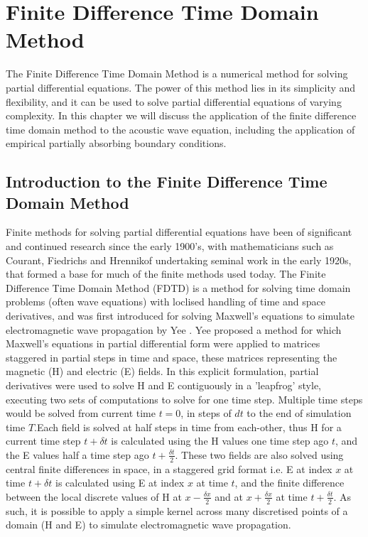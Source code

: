 %
%
%
\chapter{Finite Difference Time Domain Method}
\label{Introduction}
The Finite Difference Time Domain Method is a numerical method for solving partial differential equations. The power of this method lies in its simplicity and flexibility, and it can be used to solve partial differential equations of varying complexity. In this chapter we will discuss the application of the finite difference time domain method to the acoustic wave equation, including the application of empirical partially absorbing boundary conditions.

\section{Introduction to the Finite Difference Time Domain Method}
Finite methods for solving partial differential equations have been of significant and continued research since the early 1900's, with mathematicians such as Courant, Fiedrichs and Hrennikof undertaking seminal work in the early 1920s, that formed a base for much of the finite methods used today. The Finite Difference Time Domain Method (FDTD) is a method for solving time domain problems (often wave equations) with loclised handling of time and space derivatives, and was first introduced for solving Maxwell's equations to simulate electromagnetic wave propagation by Yee \cite{Yee1966}. Yee proposed a method for which Maxwell's equations in partial differential form were applied to matrices staggered in partial steps in time and space, these matrices representing the magnetic (H) and electric (E) fields. In this explicit formulation, partial derivatives were used to solve H and E contiguously in a 'leapfrog' style, executing two sets of computations to solve for one time step. Multiple time steps would be solved from current time $t = 0$, in steps of $dt$ to the end of simulation time $T$.Each field is solved at half steps in time from each-other, thus H for a current time step $t + \delta t$ is calculated using the H values one time step ago $t$, and the E values half a time step ago $t + \frac{\delta t}{2} $. These two fields are also solved using central finite differences in space, in a staggered grid format i.e. E at index $x$ at time $t + \delta t$ is calculated using E at index $x$ at time $t$, and the finite difference between the local discrete values of H at $x - \frac{\delta x}{2} $ and at $x + \frac{\delta x}{2} $ at time $t + \frac{\delta t}{2}$. As such, it is possible to apply a simple kernel across many discretised points of a domain (H and E) to simulate electromagnetic wave propagation.

